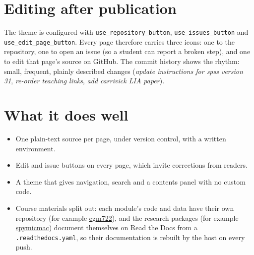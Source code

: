 \section{Editing after publication}

The theme is configured with \texttt{use\_repository\_button}, \texttt{use\_issues\_button} and \texttt{use\_edit\_page\_button}. Every page therefore carries three icons: one to the repository, one to open an issue (so a student can report a broken step), and one to edit that page's source on GitHub. The commit history shows the rhythm: small, frequent, plainly described changes (\emph{update instructions for spss version 31}, \emph{re-order teaching links}, \emph{add carrivick LIA paper}).

\section{What it does well}

\begin{itemize}
\item One plain-text source per page, under version control, with a written environment.
\item Edit and issue buttons on every page, which invite corrections from readers.
\item A theme that gives navigation, search and a contents panel with no custom code.
\item Course materials split out: each module's code and data have their own repository (for example \href{https://github.com/iamdonovan/egm722}{egm722}), and the research packages (for example \href{https://github.com/iamdonovan/spymicmac}{spymicmac}) document themselves on Read the Docs from a \texttt{.readthedocs.yaml}, so their documentation is rebuilt by the host on every push.
\end{itemize}
